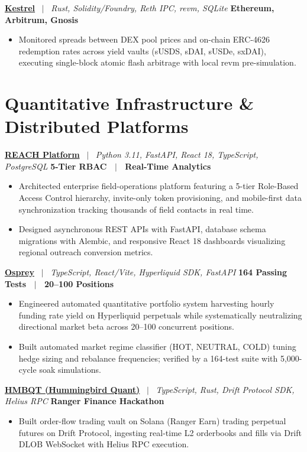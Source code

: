 \documentclass[10pt,a4paper]{article}
\begin{document}
\textbf{\href{https://github.com/Xtley001/kestrel}{Kestrel}} \ $|$ \ \textit{Rust, Solidity/Foundry, Reth IPC, revm, SQLite} \hfill \textbf{Ethereum, Arbitrum, Gnosis}
\begin{itemize}
    \item Monitored spreads between DEX pool prices and on-chain ERC-4626 redemption rates across yield vaults (sUSDS, sDAI, sUSDe, sxDAI), executing single-block atomic flash arbitrage with local revm pre-simulation.
\end{itemize}

\section{Quantitative Infrastructure \& Distributed Platforms}

\textbf{\href{https://github.com/Xtley001/reach}{REACH Platform}} \ $|$ \ \textit{Python 3.11, FastAPI, React 18, TypeScript, PostgreSQL} \hfill \textbf{5-Tier RBAC \ $|$ \ Real-Time Analytics}
\begin{itemize}
    \item Architected enterprise field-operations platform featuring a 5-tier Role-Based Access Control hierarchy, invite-only token provisioning, and mobile-first data synchronization tracking thousands of field contacts in real time.
    \item Designed asynchronous REST APIs with FastAPI, database schema migrations with Alembic, and responsive React 18 dashboards visualizing regional outreach conversion metrics.
\end{itemize}

\textbf{\href{https://github.com/Xtley001/osprey}{Osprey}} \ $|$ \ \textit{TypeScript, React/Vite, Hyperliquid SDK, FastAPI} \hfill \textbf{164 Passing Tests \ $|$ \ 20--100 Positions}
\begin{itemize}
    \item Engineered automated quantitative portfolio system harvesting hourly funding rate yield on Hyperliquid perpetuals while systematically neutralizing directional market beta across 20--100 concurrent positions.
    \item Built automated market regime classifier (HOT, NEUTRAL, COLD) tuning hedge sizing and rebalance frequencies; verified by a 164-test suite with 5,000-cycle soak simulations.
\end{itemize}

\textbf{\href{https://github.com/Xtley001/hmbqt}{HMBQT (Hummingbird Quant)}} \ $|$ \ \textit{TypeScript, Rust, Drift Protocol SDK, Helius RPC} \hfill \textbf{Ranger Finance Hackathon}
\begin{itemize}
    \item Built order-flow trading vault on Solana (Ranger Earn) trading perpetual futures on Drift Protocol, ingesting real-time L2 orderbooks and fills via Drift DLOB WebSocket with Helius RPC execution.
\end{itemize}
\end{document}
